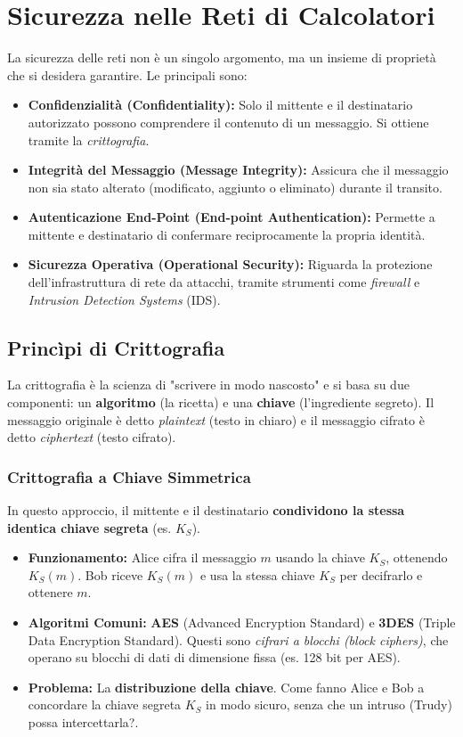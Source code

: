 \section{Sicurezza nelle Reti di Calcolatori}

La sicurezza delle reti non è un singolo argomento, ma un insieme di proprietà che si desidera garantire. Le principali sono:
\begin{itemize}
    \item \textbf{Confidenzialità (Confidentiality):} Solo il mittente e il destinatario autorizzato possono comprendere il contenuto di un messaggio. Si ottiene tramite la \textit{crittografia}.
    \item \textbf{Integrità del Messaggio (Message Integrity):} Assicura che il messaggio non sia stato alterato (modificato, aggiunto o eliminato) durante il transito.
    \item \textbf{Autenticazione End-Point (End-point Authentication):} Permette a mittente e destinatario di confermare reciprocamente la propria identità.
    \item \textbf{Sicurezza Operativa (Operational Security):} Riguarda la protezione dell'infrastruttura di rete da attacchi, tramite strumenti come \textit{firewall} e \textit{Intrusion Detection Systems} (IDS).
\end{itemize}

\subsection{Princìpi di Crittografia}
La crittografia è la scienza di "scrivere in modo nascosto" e si basa su due componenti: un \textbf{algoritmo} (la ricetta) e una \textbf{chiave} (l'ingrediente segreto). Il messaggio originale è detto \textit{plaintext} (testo in chiaro) e il messaggio cifrato è detto \textit{ciphertext} (testo cifrato).

\subsubsection{Crittografia a Chiave Simmetrica}
In questo approccio, il mittente e il destinatario \textbf{condividono la stessa identica chiave segreta} (es. $K_S$).
\begin{itemize}
    \item \textbf{Funzionamento:} Alice cifra il messaggio $m$ usando la chiave $K_S$, ottenendo $K_S(m)$. Bob riceve $K_S(m)$ e usa la stessa chiave $K_S$ per decifrarlo e ottenere $m$.
    \item \textbf{Algoritmi Comuni:} \textbf{AES} (Advanced Encryption Standard) e \textbf{3DES} (Triple Data Encryption Standard). Questi sono \textit{cifrari a blocchi (block ciphers)}, che operano su blocchi di dati di dimensione fissa (es. 128 bit per AES).
    \item \textbf{Problema:} La \textbf{distribuzione della chiave}. Come fanno Alice e Bob a concordare la chiave segreta $K_S$ in modo sicuro, senza che un intruso (Trudy) possa intercettarla?.
\end{itemize}

